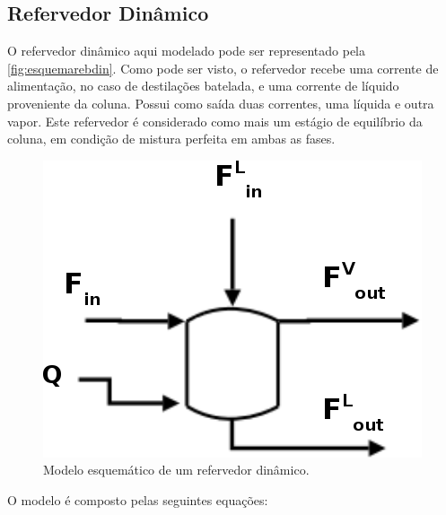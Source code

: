 \subsection{Refervedor Dinâmico} \label{sec:modelorefervedordinamico}
O refervedor dinâmico aqui modelado pode ser representado pela \autoref{fig:esquemarebdin}. Como pode ser visto, o
refervedor recebe uma corrente de alimentação, no caso de destilações batelada, e uma corrente de líquido
proveniente da coluna. Possui como
saída duas correntes, uma líquida e outra vapor. Este refervedor é considerado como mais um estágio de
equilíbrio da coluna, em condição de mistura perfeita em ambas as fases.

\begin{figure}[htb]
\centering \includegraphics[scale=0.5]{images/Chap3/esquemareboiler2.png}
\caption{Modelo esquemático de um refervedor dinâmico.}
\label{fig:esquemarebdin}
\end{figure}

O modelo é composto pelas seguintes equações:

